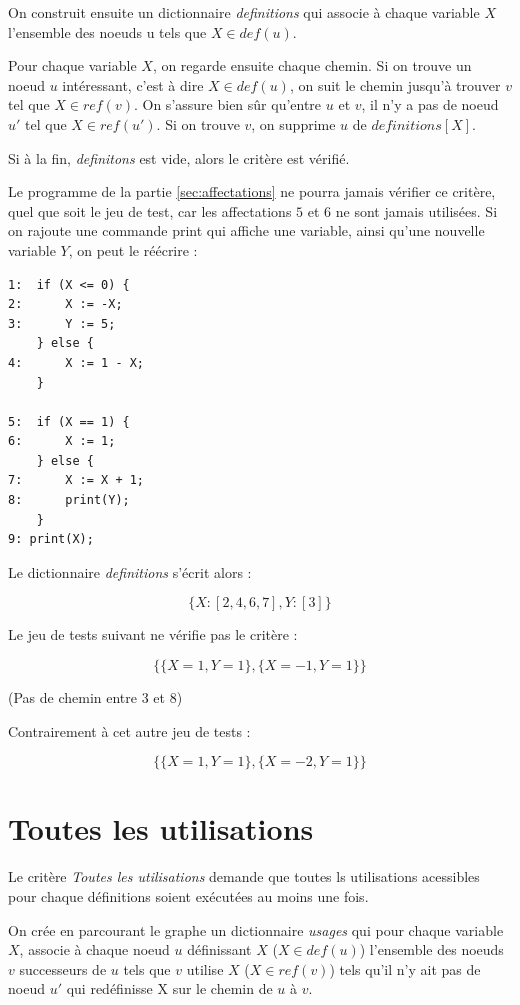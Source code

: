 \documentclass[a4paper, 12pt]{report}
\begin{document}
On construit ensuite un dictionnaire \textit{definitions} qui associe à chaque variable $X$ l'ensemble des noeuds u tels que $X \in def(u)$.

Pour chaque variable $X$, on regarde ensuite chaque chemin. Si on trouve un noeud $u$ intéressant, c'est à dire $X \in def(u)$, on suit le chemin jusqu'à trouver $v$ tel que $X \in ref(v)$. On s'assure bien sûr qu'entre $u$ et $v$, il n'y a pas de noeud $u'$ tel que $X \in ref(u')$. Si on trouve $v$, on supprime $u$ de $\textit{definitions}[X]$.

Si à la fin, \textit{definitons} est vide, alors le critère est vérifié.

Le programme de la partie \ref{sec:affectations} ne pourra jamais vérifier ce critère, quel que soit le jeu de test, car les affectations $5$ et $6$ ne sont jamais utilisées. Si on rajoute une commande print qui affiche une variable, ainsi qu'une nouvelle variable $Y$, on peut le réécrire :


\begin{verbatim}
1:  if (X <= 0) {
2:      X := -X;
3:		Y := 5;
    } else {
4:      X := 1 - X;
    }

5:  if (X == 1) {
6:      X := 1;
    } else {
7:      X := X + 1;
8:		print(Y);
    }
9: print(X);
\end{verbatim}

Le dictionnaire \textit{definitions} s'écrit alors :

\[ \{
	X : [2, 4, 6, 7],
	Y : [3]
\} \]

Le jeu de tests suivant ne vérifie pas le critère :

\[ \{
	\{ X=1, Y=1\},
	\{ X=-1, Y=1 \}
\} \]

(Pas de chemin entre 3 et 8)


Contrairement à cet autre jeu de tests :

\[ \{
	\{ X=1, Y=1\},
	\{ X=-2, Y=1 \}
\} \]

\section{Toutes les utilisations}

Le critère \textit{Toutes les utilisations} demande que toutes ls utilisations acessibles pour chaque définitions soient exécutées au moins une fois.

On crée en parcourant le graphe un dictionnaire \textit{usages} qui pour chaque variable $X$, associe à chaque noeud $u$ définissant $X$ ($X \in def(u)$) l'ensemble des noeuds $v$ successeurs de $u$ tels que $v$ utilise $X$ ($X \in ref(v)$) tels qu'il n'y ait pas de noeud $u'$ qui redéfinisse X sur le chemin de $u$ à $v$.
\end{document}
